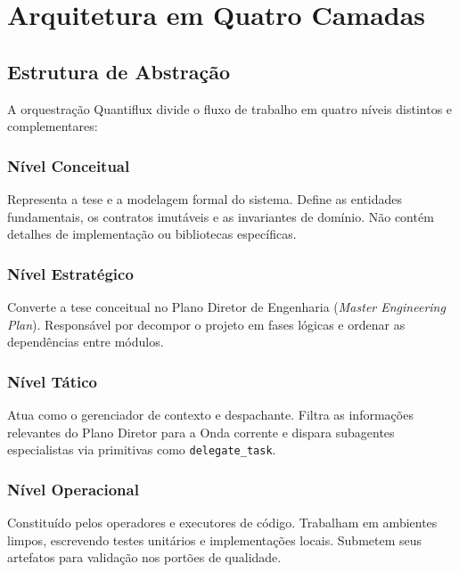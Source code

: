 \chapter{Arquitetura em Quatro Camadas}

\section{Estrutura de Abstração}
A orquestração Quantiflux divide o fluxo de trabalho em quatro níveis distintos e complementares:

\subsection{Nível Conceitual}
Representa a tese e a modelagem formal do sistema. Define as entidades fundamentais, os contratos imutáveis e as invariantes de domínio. Não contém detalhes de implementação ou bibliotecas específicas.

\subsection{Nível Estratégico}
Converte a tese conceitual no Plano Diretor de Engenharia (\emph{Master Engineering Plan}). Responsável por decompor o projeto em fases lógicas e ordenar as dependências entre módulos.

\subsection{Nível Tático}
Atua como o gerenciador de contexto e despachante. Filtra as informações relevantes do Plano Diretor para a Onda corrente e dispara subagentes especialistas via primitivas como \texttt{delegate\_task}.

\subsection{Nível Operacional}
Constituído pelos operadores e executores de código. Trabalham em ambientes limpos, escrevendo testes unitários e implementações locais. Submetem seus artefatos para validação nos portões de qualidade.